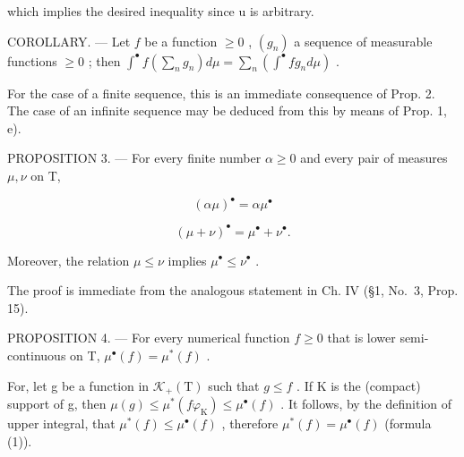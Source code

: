 which implies the desired inequality since u is arbitrary.

COROLLARY. --- Let \(f\) be a function \(\geqslant 0\) , \((g_n)\) a sequence of measurable functions \(\geqslant 0\) ; then \(\int^{\bullet} f\left(\sum_{n} g_n\right) d\mu = \sum_{n} \left(\int^{\bullet} fg_n d\mu\right)\) .

For the case of a finite sequence, this is an immediate consequence of Prop. 2. The case of an infinite sequence may be deduced from this by means of Prop. 1, e).

PROPOSITION 3. --- For every finite number \(\alpha \geqslant 0\) and every pair of measures \(\mu, \nu\) on T,

\[
(\alpha \mu) ^ {\bullet} = \alpha \mu^ {\bullet}
\]

\[
(\mu + \nu) ^ {\bullet} = \mu^ {\bullet} + \nu^ {\bullet}.
\]

Moreover, the relation \(\mu \leqslant \nu\) implies \(\mu^{\bullet} \leqslant \nu^{\bullet}\) .

The proof is immediate from the analogous statement in Ch. IV (§1, No.~3, Prop. 15).

PROPOSITION 4. --- For every numerical function \(f \geqslant 0\) that is lower semi-continuous on T, \(\mu^{\bullet}(f) = \mu^{*}(f)\) .

For, let g be a function in \(\mathcal{K}_{+}(\mathrm{T})\) such that \(g \leqslant f\) . If K is the (compact) support of g, then \(\mu(g) \leqslant \mu^{*}(f\varphi_{\mathrm{K}}) \leqslant \mu^{\bullet}(f)\) . It follows, by the definition of upper integral, that \(\mu^{*}(f) \leqslant \mu^{\bullet}(f)\) , therefore \(\mu^{*}(f) = \mu^{\bullet}(f)\) (formula (1)).

